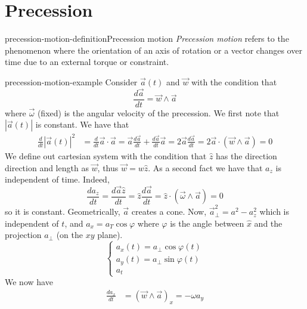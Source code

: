 \documentclass[preview]{standalone}
\begin{document}
\genpage

\section{Precession}

\begin{snippetdefinition}{precession-motion-definition}{Precession motion}
    \emph{Precession motion} refers to the phenomenon where the orientation of an axis of
    rotation or a vector changes over time due to an external torque or constraint.
\end{snippetdefinition}

\begin{snippetexample}{precession-motion-example}{}
    Consider \(\vec{a}(t)\) and \(\vec{w}\) with the condition that
    \[
        \frac{d\vec{a}}{dt} = \vec{w} \wedge \vec{a}
    \]
    where \(\vec{\omega}\) (fixed) is the angular velocity of the precession.
    We first note that \(|\vec{a}(t)|\) is constant.
    We have that
    \begin{align*}
        \frac{d}{dt} {|\vec{a}(t)|}^2 &= \frac{d}{dt} \vec{a}\cdot\vec{a}
        = \vec{a}\frac{d\vec{a}}{dt} + \frac{d\vec{a}}{dt} \vec{a} 
        = 2\vec{a}\frac{d\vec{a}}{dt}
        = 2 \vec{a} \cdot (\vec{w} \wedge \vec{a})
        = 0
    \end{align*}
    We define out cartesian system with the condition that \(\hat{z}\) has the direction
    direction and length as \(\vec{w}\), thus \(\vec{w} = w\hat{z}\).
    As a second fact we have that \(a_z\) is independent of time.
    Indeed,
    \[
        \frac{da_z}{dt} = \frac{d\vec{a}\hat{z}}{dt} =  \hat{z}\frac{d\vec{a}}{dt}
        = \hat{z} \cdot (\vec{\omega} \wedge \vec{a})
        = 0
    \]
    so it is constant. Geometrically, \(\vec{a}\) creates a cone.
    Now, \(\vec{a}_\perp^2 = a^2 - a_z^2\) which is independent of \(t\),
    and \(a_x = a_T \cos\varphi\) where \(\varphi\) is the angle between \(\hat{x}\)
    and the projection \(a_\perp\) (on the \(xy\) plane).
    \[
        \begin{cases}
            a_x(t) = a_\perp \cos\varphi(t) \\
            a_y(t) = a_\perp \sin\varphi(t) \\
            a_t
        \end{cases}
    \]
    We now have
    \begin{align*}
        \frac{da_x}{dt} &= {(\vec{w} \wedge \vec{a})}_x
        = -\omega a_y \\

\end{align*}
\end{snippetexample}
\end{document}
